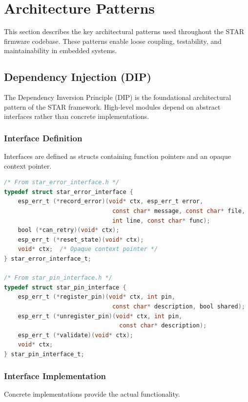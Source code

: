 \section{Architecture Patterns}

This section describes the key architectural patterns used throughout the STAR firmware codebase. These patterns enable loose coupling, testability, and maintainability in embedded systems.

\subsection{Dependency Injection (DIP)}

The Dependency Inversion Principle (DIP) is the foundational architectural pattern of the STAR framework. High-level modules depend on abstract interfaces rather than concrete implementations.

\subsubsection{Interface Definition}

Interfaces are defined as structs containing function pointers and an opaque context pointer.

\begin{lstlisting}[language=C]
/* From star_error_interface.h */
typedef struct star_error_interface {
    esp_err_t (*record_error)(void* ctx, esp_err_t error,
                               const char* message, const char* file,
                               int line, const char* func);
    bool (*can_retry)(void* ctx);
    esp_err_t (*reset_state)(void* ctx);
    void* ctx;  /* Opaque context pointer */
} star_error_interface_t;

/* From star_pin_interface.h */
typedef struct star_pin_interface {
    esp_err_t (*register_pin)(void* ctx, int pin,
                               const char* description, bool shared);
    esp_err_t (*unregister_pin)(void* ctx, int pin,
                                 const char* description);
    esp_err_t (*validate)(void* ctx);
    void* ctx;
} star_pin_interface_t;
\end{lstlisting}

\subsubsection{Interface Implementation}

Concrete implementations provide the actual functionality.

